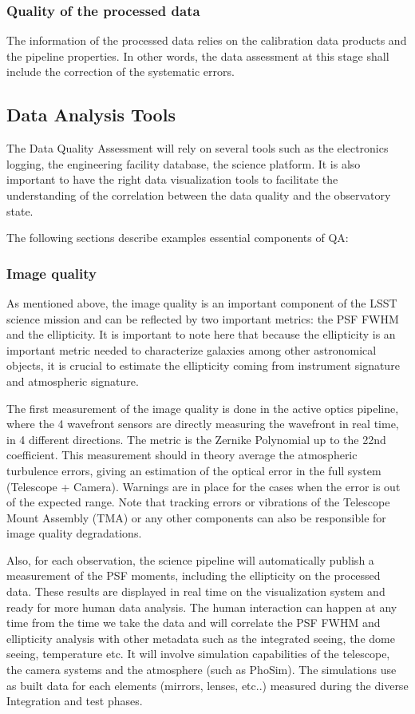 \subsubsection{Quality of the processed data}

The information of the processed data relies on the calibration data products and the pipeline properties. In other words, the data assessment at this stage shall include the correction of the systematic errors. 


\subsection{Data Analysis Tools}
The Data Quality Assessment will rely on several tools such as the electronics logging, the engineering facility database, the science platform.  It is also important to have the right data visualization tools to facilitate the understanding of the correlation between the data quality and the observatory state. 

The following sections describe examples essential components of QA:

\subsubsection{Image quality}
As mentioned above, the image quality is an important component of the LSST science mission and can be reflected by two important metrics: the PSF FWHM and the ellipticity. It is important to note here that because the ellipticity is an important metric needed to characterize galaxies among other astronomical objects, it is crucial to estimate the ellipticity coming from instrument signature and atmospheric signature.

The first measurement of the image quality is done in the active optics pipeline, where the 4 wavefront sensors are directly measuring the wavefront in real time, in 4 different directions. The metric is the Zernike Polynomial up to the 22nd coefficient. This measurement should in theory average the atmospheric turbulence errors, giving an estimation of the optical error in the full system (Telescope + Camera). Warnings are in place for the cases when the error is out of the expected range. Note that tracking errors or vibrations of the Telescope Mount Assembly (TMA) or any other components can also be responsible for image quality degradations. 

 Also, for each observation, the science pipeline will automatically publish a measurement of the PSF moments, including the ellipticity on the processed data. These results are displayed in real time on the visualization system and ready for more human data analysis. 
The human interaction can happen at any time from the time we take the data and will correlate the PSF FWHM and ellipticity analysis with other metadata such as the integrated seeing, the dome seeing, temperature etc. It will involve simulation capabilities of the telescope, the camera systems and the atmosphere (such as PhoSim). The simulations use as built data for each elements (mirrors, lenses, etc..) measured during the diverse Integration and test phases.

